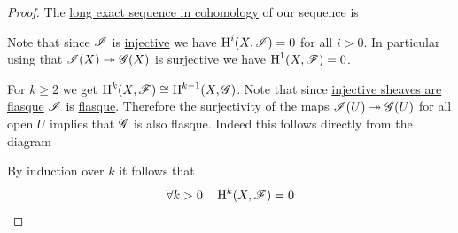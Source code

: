\documentclass[../../main]{subfiles}
\begin{document}
\begin{proof}
  The \hyperref[thm:LES-derived-functor]{long exact sequence in cohomology} of our sequence is
  \begin{center}
  \end{center}
  Note that since \(\mathscr{I}\) is \hyperref[def:injective-projective-object]{injective} we have \(\operatorname{H}^{i}(X, \mathscr{I}) = 0\) for all \(i > 0\).
  In particular using that \(\mathscr{I}(X) \twoheadrightarrow \mathscr{G}(X)\) is surjective we have \(\operatorname{H}^{1}(X, \mathscr{F}) = 0\).

  For \(k \geq 2\) we get \(\operatorname{H}^{k}(X, \mathscr{F}) \cong \operatorname{H}^{k-1}(X, \mathscr{G})\).
  Note that since \hyperref[lemma:injective-sheaves-are-flasque]{injective sheaves are flasque} \(\mathscr{I}\) is \hyperref[def:flasque-sheaf]{flasque}.
  Therefore the surjectivity of the maps \(\mathscr{I}(U) \twoheadrightarrow \mathscr{G}(U)\) for all open \(U\) implies that \(\mathscr{G}\) is also flasque.
  Indeed this follows directly from the diagram
  \begin{center}
  \end{center}

  By induction over \(k\) it follows that
  \begin{equation*}
    \forall k > 0 \quad \operatorname{H}^{k}(X, \mathscr{F}) = 0 \qedhere
  \end{equation*}
\end{proof}
\end{document}

